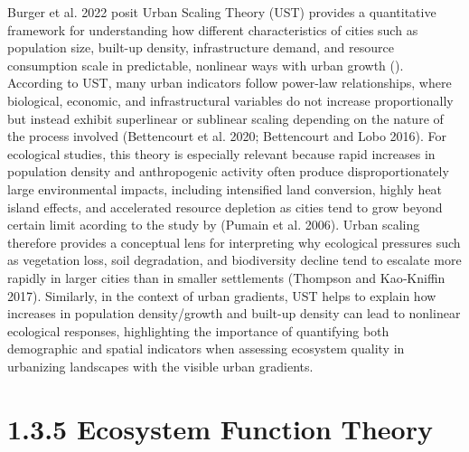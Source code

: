Burger et al. 2022 posit Urban Scaling Theory (UST) provides a quantitative framework for understanding how different characteristics of cities such as population size, built-up density, infrastructure demand, and resource consumption scale in predictable, nonlinear ways with urban growth (). According to UST, many urban indicators follow power-law relationships, where biological, economic, and infrastructural variables do not increase proportionally but instead exhibit superlinear or sublinear scaling depending on the nature of the process involved (Bettencourt et al. 2020; Bettencourt and Lobo 2016). For ecological studies, this theory is especially relevant because rapid increases in population density and anthropogenic activity often produce disproportionately large environmental impacts, including intensified land conversion, highly heat island effects, and accelerated resource depletion as cities tend to grow beyond certain limit acording to the study by (Pumain et al. 2006). Urban scaling therefore provides a conceptual lens for interpreting why ecological pressures such as vegetation loss, soil degradation, and biodiversity decline tend to escalate more rapidly in larger cities than in smaller settlements (Thompson and Kao‐Kniffin 2017). Similarly, in the context of urban gradients, UST helps to explain how increases in population density/growth and built-up density can lead to nonlinear ecological responses, highlighting the importance of quantifying both demographic and spatial indicators when assessing ecosystem quality in urbanizing landscapes with the visible urban gradients.
\hypertarget{ecosystem-function-theory}{%
\section{\texorpdfstring{\textbf{1.3.5 Ecosystem Function Theory}}{1.3.5 Ecosystem Function Theory}}\label{ecosystem-function-theory}}

